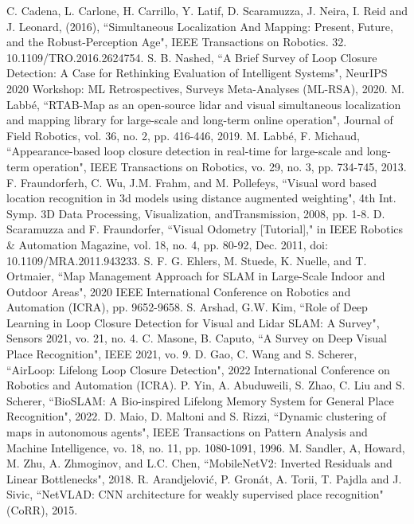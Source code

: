 \documentclass[letterpaper, 10 pt, conference]{ieeeconf}  %
\begin{document}
\begin{thebibliography}{99}

 C. Cadena, L. Carlone, H. Carrillo, Y. Latif, D. Scaramuzza, J. Neira, I. Reid and J. Leonard, (2016), ``Simultaneous Localization And Mapping: Present, Future, and the Robust-Perception Age", IEEE Transactions on Robotics. 32. 10.1109/TRO.2016.2624754. 
 S. B. Nashed, ``A Brief Survey of Loop Closure Detection: A Case for Rethinking Evaluation of Intelligent Systems", NeurIPS 2020 Workshop: ML Retrospectives, Surveys Meta-Analyses (ML-RSA), 2020.
 M. Labbé, ``RTAB-Map as an open-source lidar and visual simultaneous localization and mapping library for large-scale and long-term online operation", Journal of Field Robotics, vol. 36, no. 2, pp. 416-446, 2019.
 M. Labbé, F. Michaud, ``Appearance-based loop closure detection in real-time for large-scale and long-term operation", IEEE Transactions on Robotics, vo. 29, no. 3, pp. 734-745, 2013.
 F. Fraundorferh, C. Wu, J.M. Frahm, and M. Pollefeys, ``Visual word based location recognition in 3d models using distance augmented weighting", 4th Int. Symp. 3D Data Processing, Visualization, andTransmission, 2008, pp. 1-8. 
 D. Scaramuzza and F. Fraundorfer, ``Visual Odometry [Tutorial]," in IEEE Robotics \& Automation Magazine, vol. 18, no. 4, pp. 80-92, Dec. 2011, doi: 10.1109/MRA.2011.943233.
 S. F. G. Ehlers, M. Stuede, K. Nuelle, and T. Ortmaier, ``Map Management Approach for SLAM in Large-Scale Indoor and Outdoor Areas", 2020 IEEE International Conference on Robotics and Automation (ICRA), pp. 9652-9658.
 S. Arshad, G.W. Kim, ``Role of Deep Learning in Loop Closure Detection for Visual and Lidar SLAM: A Survey", Sensors 2021, vo. 21, no. 4.
 C. Masone, B. Caputo, ``A Survey on Deep Visual Place Recognition", IEEE 2021, vo. 9.
 D. Gao, C. Wang and S. Scherer, ``AirLoop: Lifelong Loop Closure Detection", 2022 International Conference on Robotics and Automation (ICRA).
 P. Yin, A. Abuduweili, S. Zhao, C. Liu and S. Scherer, ``BioSLAM: A Bio-inspired Lifelong Memory System for General Place Recognition", 2022.
 D. Maio, D. Maltoni and S. Rizzi, ``Dynamic clustering of maps in autonomous agents", IEEE Transactions on Pattern Analysis and Machine Intelligence, vo. 18, no. 11, pp. 1080-1091, 1996.
 M. Sandler, A, Howard, M. Zhu, A. Zhmoginov, and L.C. Chen, ``MobileNetV2: Inverted Residuals and Linear Bottlenecks", 2018.
 R. Arandjelovi\'c, P. Gron{\'{a}}t, A. Torii, T. Pajdla and J. Sivic, ``NetVLAD: {CNN} architecture for weakly supervised place recognition" (CoRR), 2015. 

\end{thebibliography}
\end{document}
